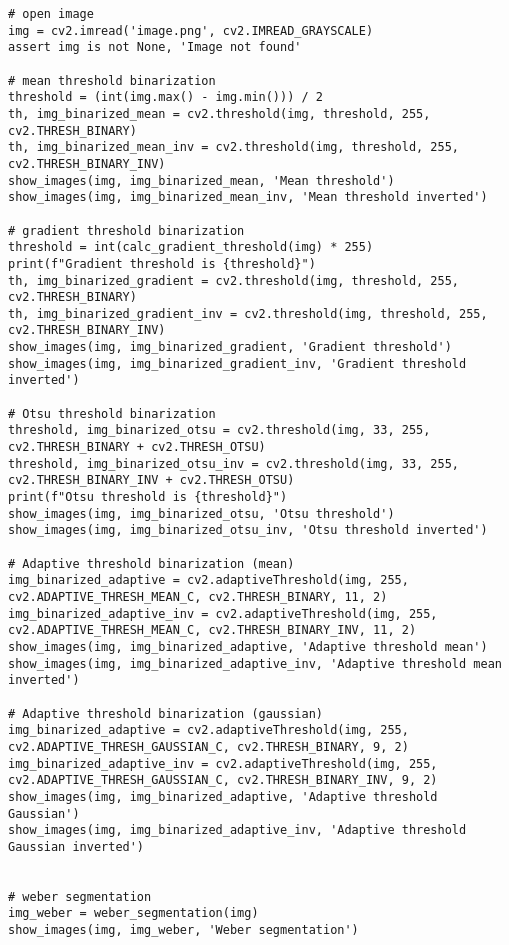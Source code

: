 \begin{lstlisting}[caption={caption text}, label={lst:}]
# open image
img = cv2.imread('image.png', cv2.IMREAD_GRAYSCALE)
assert img is not None, 'Image not found'

# mean threshold binarization
threshold = (int(img.max() - img.min())) / 2
th, img_binarized_mean = cv2.threshold(img, threshold, 255, cv2.THRESH_BINARY)
th, img_binarized_mean_inv = cv2.threshold(img, threshold, 255, cv2.THRESH_BINARY_INV)
show_images(img, img_binarized_mean, 'Mean threshold')
show_images(img, img_binarized_mean_inv, 'Mean threshold inverted')

# gradient threshold binarization
threshold = int(calc_gradient_threshold(img) * 255)
print(f"Gradient threshold is {threshold}")
th, img_binarized_gradient = cv2.threshold(img, threshold, 255, cv2.THRESH_BINARY)
th, img_binarized_gradient_inv = cv2.threshold(img, threshold, 255, cv2.THRESH_BINARY_INV)
show_images(img, img_binarized_gradient, 'Gradient threshold')
show_images(img, img_binarized_gradient_inv, 'Gradient threshold inverted')

# Otsu threshold binarization
threshold, img_binarized_otsu = cv2.threshold(img, 33, 255, cv2.THRESH_BINARY + cv2.THRESH_OTSU)
threshold, img_binarized_otsu_inv = cv2.threshold(img, 33, 255, cv2.THRESH_BINARY_INV + cv2.THRESH_OTSU)
print(f"Otsu threshold is {threshold}")
show_images(img, img_binarized_otsu, 'Otsu threshold')
show_images(img, img_binarized_otsu_inv, 'Otsu threshold inverted')

# Adaptive threshold binarization (mean)
img_binarized_adaptive = cv2.adaptiveThreshold(img, 255, cv2.ADAPTIVE_THRESH_MEAN_C, cv2.THRESH_BINARY, 11, 2)
img_binarized_adaptive_inv = cv2.adaptiveThreshold(img, 255, cv2.ADAPTIVE_THRESH_MEAN_C, cv2.THRESH_BINARY_INV, 11, 2)
show_images(img, img_binarized_adaptive, 'Adaptive threshold mean')
show_images(img, img_binarized_adaptive_inv, 'Adaptive threshold mean inverted')

# Adaptive threshold binarization (gaussian)
img_binarized_adaptive = cv2.adaptiveThreshold(img, 255, cv2.ADAPTIVE_THRESH_GAUSSIAN_C, cv2.THRESH_BINARY, 9, 2)
img_binarized_adaptive_inv = cv2.adaptiveThreshold(img, 255, cv2.ADAPTIVE_THRESH_GAUSSIAN_C, cv2.THRESH_BINARY_INV, 9, 2)
show_images(img, img_binarized_adaptive, 'Adaptive threshold Gaussian')
show_images(img, img_binarized_adaptive_inv, 'Adaptive threshold Gaussian inverted')


# weber segmentation
img_weber = weber_segmentation(img)
show_images(img, img_weber, 'Weber segmentation')


\end{lstlisting}
